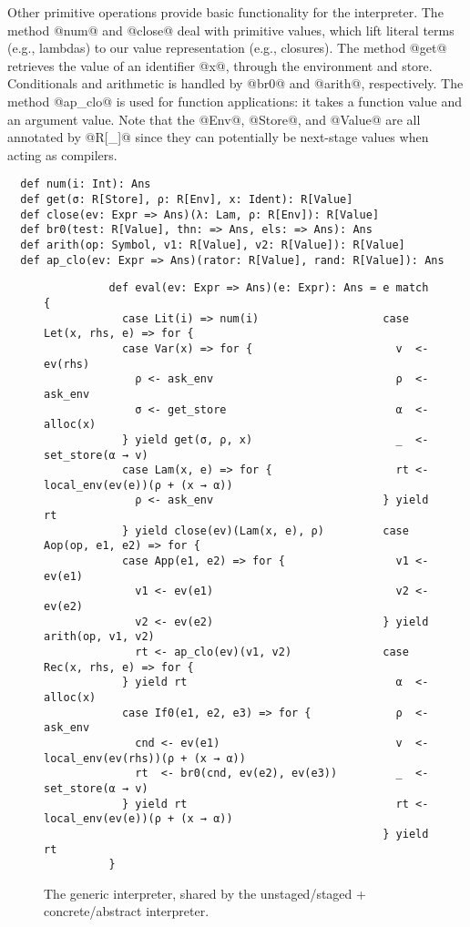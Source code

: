 Other primitive operations provide basic functionality for the
interpreter.  The method @num@ and @close@ deal with primitive values,
which lift literal terms (e.g., lambdas) to our value representation
(e.g., closures).  The method @get@ retrieves the value of an
identifier @x@, through the environment and store. Conditionals and
arithmetic is handled by @br0@ and @arith@, respectively. The method
@ap_clo@ is used for function applications: it takes a function value
and an argument value. Note that the @Env@, @Store@, and @Value@ are
all annotated by @R[_]@ since they can potentially be next-stage
values when acting as compilers.

\begin{lstlisting}
  def num(i: Int): Ans
  def get(σ: R[Store], ρ: R[Env], x: Ident): R[Value]
  def close(ev: Expr => Ans)(λ: Lam, ρ: R[Env]): R[Value]
  def br0(test: R[Value], thn: => Ans, els: => Ans): Ans
  def arith(op: Symbol, v1: R[Value], v2: R[Value]): R[Value]
  def ap_clo(ev: Expr => Ans)(rator: R[Value], rand: R[Value]): Ans
\end{lstlisting}

\begin{figure}[h!]
  \centering
  \begin{lstlisting}
          def eval(ev: Expr => Ans)(e: Expr): Ans = e match {
            case Lit(i) => num(i)                   case Let(x, rhs, e) => for {
            case Var(x) => for {                      v  <- ev(rhs)
              ρ <- ask_env                            ρ  <- ask_env
              σ <- get_store                          α  <- alloc(x)
            } yield get(σ, ρ, x)                      _  <- set_store(α → v)
            case Lam(x, e) => for {                   rt <- local_env(ev(e))(ρ + (x → α))
              ρ <- ask_env                          } yield rt
            } yield close(ev)(Lam(x, e), ρ)         case Aop(op, e1, e2) => for {
            case App(e1, e2) => for {                 v1 <- ev(e1)                                               
              v1 <- ev(e1)                            v2 <- ev(e2)
              v2 <- ev(e2)                          } yield arith(op, v1, v2)
              rt <- ap_clo(ev)(v1, v2)              case Rec(x, rhs, e) => for {
            } yield rt                                α  <- alloc(x)
            case If0(e1, e2, e3) => for {             ρ  <- ask_env
              cnd <- ev(e1)                           v  <- local_env(ev(rhs))(ρ + (x → α))
              rt  <- br0(cnd, ev(e2), ev(e3))         _  <- set_store(α → v)
            } yield rt                                rt <- local_env(ev(e))(ρ + (x → α))
                                                    } yield rt                    
          }
  \end{lstlisting}
\caption{The generic interpreter,
  shared by the unstaged/staged + concrete/abstract interpreter.}
\label{fig:shared_int}
\end{figure}

